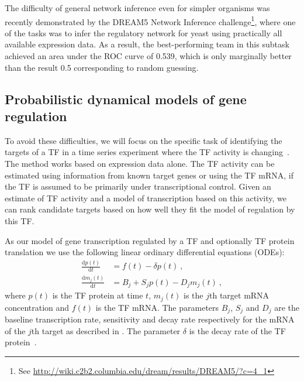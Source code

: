 \documentclass[11pt]{article}
\begin{document}
The difficulty of general network inference even for simpler organisms
was recently demonstrated by the DREAM5 Network Inference
challenge\footnote{See
  \url{http://wiki.c2b2.columbia.edu/dream/results/DREAM5/?c=4_1}},
where one of the tasks was to infer the regulatory network for yeast
using practically all available expression data.  As a result, the
best-performing team in this subtask achieved an area under the ROC
curve of 0.539, which is only marginally better than the result 0.5
corresponding to random guessing.

\subsection{Probabilistic dynamical models of gene regulation}

To avoid these difficulties, we will focus on the specific task of
identifying the targets of a TF in a time series experiment where the
TF activity is changing~\cite{Gao2008,Honkela2010PNAS}.  The method
works based on expression data alone.  The TF activity can be
estimated using information from known target genes or using the TF
mRNA, if the TF is assumed to be primarily under transcriptional
control.  Given an estimate of TF activity and a model of
transcription based on this activity, we can rank candidate targets
based on how well they fit the model of regulation by this TF.

As our model of gene transcription regulated by a TF and optionally
TF protein translation we use the following linear ordinary
differential equations (ODEs):
\begin{align}
  \frac{\mathrm{d}p(t)}{\mathrm{d}t} & = f(t) - \delta
  p(t) \ , \label{eq:translation_ode} \\
  \frac{\mathrm{d}m_j(t)}{\mathrm{d}t} & = B_j+S_j p(t)-D_j m_j(t) \ , \label{eq:transcription_ode}
\end{align}
where $p(t)$ is the TF protein at time $t$, $m_j(t)$ is the $j$th
target mRNA concentration and $f(t)$ is the TF mRNA. The parameters
$B_j$, $S_j$ and $D_j$ are the baseline transcription rate,
sensitivity and decay rate respectively for the mRNA of the $j$th
target as described in \cite{Barenco2006a}.  The parameter
$\delta$ is the decay rate of the TF protein~\cite{Honkela2010PNAS}.
\end{document}
